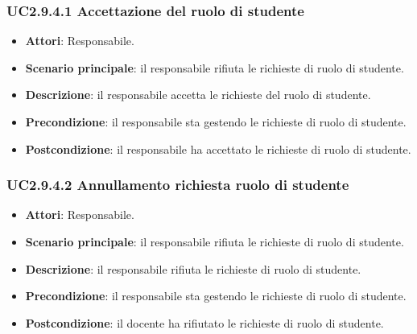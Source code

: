 \subsubsection{UC2.9.4.1 Accettazione del ruolo di studente}
\begin{itemize}
\item \textbf{Attori}: Responsabile.
\item \textbf{Scenario principale}: il responsabile rifiuta le richieste di ruolo di studente.
\item \textbf{Descrizione}: il responsabile accetta le richieste del ruolo di studente.
\item \textbf{Precondizione}: il responsabile sta gestendo le richieste di ruolo di studente.
\item \textbf{Postcondizione}: il responsabile ha accettato le richieste di ruolo di studente.
\end{itemize}
\subsubsection{UC2.9.4.2 Annullamento richiesta ruolo di studente}
\begin{itemize}
\item \textbf{Attori}: Responsabile.
\item \textbf{Scenario principale}: il responsabile rifiuta le richieste di ruolo di studente.
\item \textbf{Descrizione}: il responsabile rifiuta le richieste di ruolo di studente.
\item \textbf{Precondizione}: il responsabile sta gestendo le richieste di ruolo di studente.
\item \textbf{Postcondizione}: il docente ha rifiutato le richieste di ruolo di studente.
\end{itemize}
